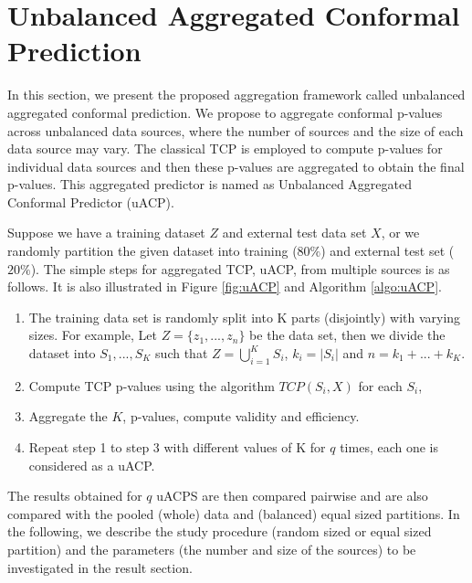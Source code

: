\documentclass[main]{subfiles}
\begin{document}
\section{Unbalanced Aggregated Conformal Prediction}
In this section, we present the proposed aggregation framework called unbalanced aggregated conformal prediction. We propose to aggregate conformal p-values across unbalanced data sources, where the number of sources and the size of each data source may vary. The classical TCP is employed to compute p-values for individual data sources and then these p-values are aggregated to obtain the final p-values. This aggregated predictor is named as Unbalanced Aggregated Conformal Predictor (uACP). 

Suppose we have a training dataset $Z$ and  external test data set $X$, or we randomly partition the given dataset into training ($80\%$) and external test set ($20\%$). The simple steps  for aggregated TCP, uACP, from multiple sources is as follows. It is also illustrated in Figure \ref{fig:uACP} and Algorithm \ref{algo:uACP}.
\begin{enumerate}

\item The training data set is randomly split into K parts (disjointly) with varying sizes. For example, Let $Z = \{ z_1 , ..., z_n \} $ be the data set, then we divide the dataset into $S_1, ..., S_K$ such that $Z = \bigcup_{i=1}^K S_i$, $k_i = |S_i|$ and $n = k_1+ ...+k_K$.

\item Compute TCP p-values using the algorithm $TCP(S_i, X)$ for each $S_i$, 

\item Aggregate the $K$, p-values, compute validity and efficiency.  

\item Repeat step 1 to step 3 with different values of K for $q$ times, each one is considered as a uACP. %


\end{enumerate}

The results obtained for $q$ uACPS are then compared pairwise and are also compared with the pooled (whole) data and (balanced) equal sized partitions. In the following, we describe the study procedure (random sized or equal sized partition) and the parameters (the number and size of the sources) to be investigated in the result section. 
\end{document}
